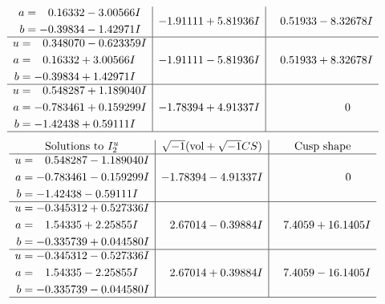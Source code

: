 \documentclass[1p]{elsarticle_modified}
\theoremstyle{definition}
\newcommand{\I}{\sqrt{-1}}
\begin{document}
$$\begin{array}{c|c|c}
\begin{aligned}
a &= \phantom{-}0.16332 - 3.00566 I \\
b &= -0.39834 - 1.42971 I\end{aligned}
 & -1.91111 + 5.81936 I & \phantom{-}0.51933 - 8.32678 I \\ \hline\begin{aligned}
u &= \phantom{-}0.348070 - 0.623359 I \\
a &= \phantom{-}0.16332 + 3.00566 I \\
b &= -0.39834 + 1.42971 I\end{aligned}
 & -1.91111 - 5.81936 I & \phantom{-}0.51933 + 8.32678 I \\ \hline\begin{aligned}
u &= \phantom{-}0.548287 + 1.189040 I \\
a &= -0.783461 + 0.159299 I \\
b &= -1.42438 + 0.59111 I\end{aligned}
 & -1.78394 + 4.91337 I & \phantom{-0.000000 } 0\\
 \hline 
 \end{array}$$\newpage$$\begin{array}{c|c|c}  
\text{Solutions to }I^u_{2}& \I (\text{vol} + \sqrt{-1}CS) & \text{Cusp shape}\\
 \hline 
\begin{aligned}
u &= \phantom{-}0.548287 - 1.189040 I \\
a &= -0.783461 - 0.159299 I \\
b &= -1.42438 - 0.59111 I\end{aligned}
 & -1.78394 - 4.91337 I & \phantom{-0.000000 } 0 \\ \hline\begin{aligned}
u &= -0.345312 + 0.527336 I \\
a &= \phantom{-}1.54335 + 2.25855 I \\
b &= -0.335739 + 0.044580 I\end{aligned}
 & \phantom{-}2.67014 - 0.39884 I & \phantom{-}7.4059 + 16.1405 I \\ \hline\begin{aligned}
u &= -0.345312 - 0.527336 I \\
a &= \phantom{-}1.54335 - 2.25855 I \\
b &= -0.335739 - 0.044580 I\end{aligned}
 & \phantom{-}2.67014 + 0.39884 I & \phantom{-}7.4059 - 16.1405 I\\
 \hline 
 \end{array}$$\newpage
\newpage\renewcommand{\arraystretch}{1}
\end{document}
